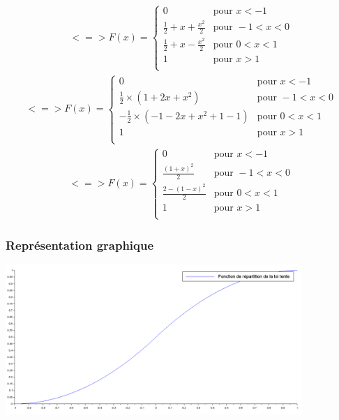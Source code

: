 \documentclass{article}
\begin{document}
\begin{align}
<=>
F(x)=\left\{
	\begin{array}{llll}
		0 & \mbox{pour } x<-1\\
		\frac{1}{2} + x + \frac{x^2}{2} &\mbox{pour } -1<x<0\\
		\frac{1}{2} + x - \frac{x^2}{2} &\mbox{pour } 0<x<1\\
		1 & \mbox{pour } x>1\\
	\end{array}
\right.
\end{align}
\begin{align}
<=>
F(x)=\left\{
	\begin{array}{llll}
		0 & \mbox{pour } x<-1\\
		\frac{1}{2} \times (1 + 2x + x^2) &\mbox{pour } -1<x<0\\
		-\frac{1}{2} \times (-1 - 2x + x^2 +1 -1) &\mbox{pour } 0<x<1\\
		1 & \mbox{pour } x>1\\
	\end{array}
\right.
\end{align}
\begin{align}
<=>
F(x)=\left\{
	\begin{array}{llll}
		0 & \mbox{pour } x<-1\\
		\frac{(1+x)^2}{2} &\mbox{pour } -1<x<0\\
		\frac{2-(1-x)^2}{2} &\mbox{pour } 0<x<1\\
		1 & \mbox{pour } x>1\\
	\end{array}
\right.
\end{align}

\subsubsection{Représentation graphique}
\begin{center}
\includegraphics[width=425px]{img/tente_repartition.png}
\end{center}
\end{document}
